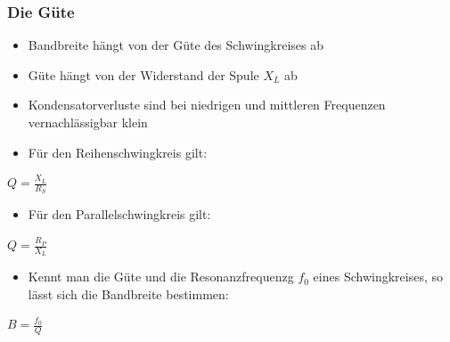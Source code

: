 \begin{frame}
\frametitle{Die Güte}
\begin{itemize}
	\item Bandbreite hängt von der Güte des Schwingkreises ab
	\item Güte hängt von der Widerstand der Spule $X_L$ ab
	\item	Kondensatorverluste sind bei niedrigen und mittleren Frequenzen vernachlässigbar klein
\end{itemize}
\vspace{3mm}
\begin{itemize}
	\item	Für den Reihenschwingkreis gilt:
\end{itemize}
\begin{Large}
	\begin{center}
		$Q = \frac{X_L}{R_S}$
	\end{center}
\end{Large}
\begin{itemize}
	\item	Für den Parallelschwingkreis gilt:
\end{itemize}
\begin{Large}
	\begin{center}
		$Q = \frac{R_P}{X_L}$
	\end{center}
\end{Large}
\begin{itemize}
	\item	Kennt man die Güte und die Resonanzfrequenzg $f_0$ eines Schwingkreises, so lässt sich die Bandbreite bestimmen:
\end{itemize}
\begin{Large}
	\begin{center}
		$B = \frac{f_0}{Q}$
	\end{center}
\end{Large}
\end{frame}

